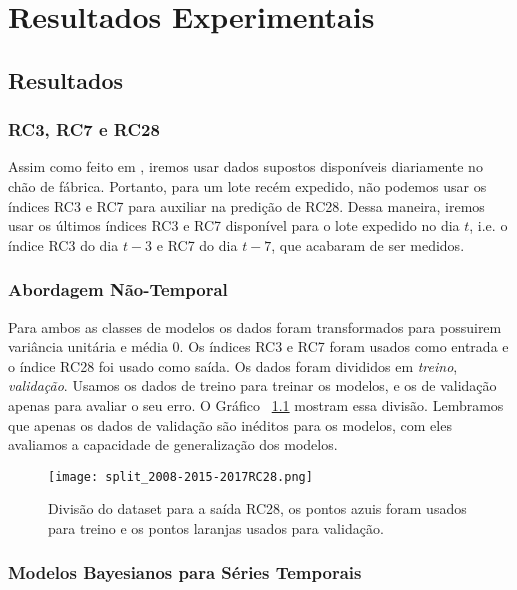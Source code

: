 
\chapter{Resultados Experimentais }
\label{cap:resultados}

\section{Resultados}


\subsection{RC3, RC7 e RC28}

Assim como feito em \cite{greciaLin}, iremos usar dados supostos disponíveis diariamente no chão de fábrica. Portanto, para um lote recém expedido,
não podemos usar os índices RC3 e RC7 para auxiliar na predição de RC28. Dessa maneira, iremos usar os últimos índices RC3 e RC7 disponível para o lote expedido no dia $t$,
i.e. o índice RC3 do dia $t-3$ e RC7 do dia $t-7$, que acabaram de ser medidos. \\


\subsection{Abordagem Não-Temporal}

 Para ambos as classes de modelos os dados foram transformados para possuirem variância
unitária e média 0. Os índices RC3 e RC7 foram usados como entrada e o índice
RC28 foi usado como saída. Os dados foram divididos em
\textit{treino}, \textit{validação}. Usamos os dados de treino 
para treinar os
modelos, e os de validação apenas para avaliar o seu erro. O Gráfico
~\ref{fig:divrc28} mostram essa divisão. Lembramos que apenas os dados de
validação são inéditos para os modelos, com eles avaliamos a capacidade de
generalização dos modelos. 


\begin{figure}[H]
  \centering
\texttt{[image: split\_2008-2015-2017RC28.png]}
\caption{Divisão do dataset para a saída RC28, os pontos azuis foram usados para
treino e os pontos laranjas usados para validação.}
  \label{fig:divrc28}
\end{figure}


\subsection{Modelos Bayesianos para Séries Temporais}


